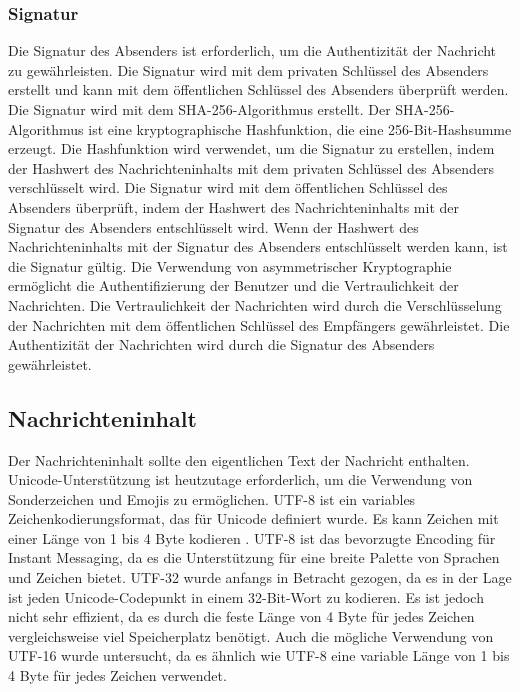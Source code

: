 \subsubsection{Signatur}
\label{subsubsec:signatur}

Die Signatur des Absenders ist erforderlich, um die Authentizität der Nachricht zu gewährleisten. Die Signatur wird mit dem privaten Schlüssel des Absenders erstellt und kann mit dem öffentlichen Schlüssel des Absenders überprüft werden. Die Signatur wird mit dem SHA-256-Algorithmus erstellt. Der SHA-256-Algorithmus ist eine kryptographische Hashfunktion, die eine 256-Bit-Hashsumme erzeugt. Die Hashfunktion wird verwendet, um die Signatur zu erstellen, indem der Hashwert des Nachrichteninhalts mit dem privaten Schlüssel des Absenders verschlüsselt wird. Die Signatur wird mit dem öffentlichen Schlüssel des Absenders überprüft, indem der Hashwert des Nachrichteninhalts mit der Signatur des Absenders entschlüsselt wird. Wenn der Hashwert des Nachrichteninhalts mit der Signatur des Absenders entschlüsselt werden kann, ist die Signatur gültig. Die Verwendung von asymmetrischer Kryptographie ermöglicht die Authentifizierung der Benutzer und die Vertraulichkeit der Nachrichten. Die Vertraulichkeit der Nachrichten wird durch die Verschlüsselung der Nachrichten mit dem öffentlichen Schlüssel des Empfängers gewährleistet. Die Authentizität der Nachrichten wird durch die Signatur des Absenders gewährleistet.

\subsection{Nachrichteninhalt}
\label{subsec:nachrichteninhalt}

Der Nachrichteninhalt sollte den eigentlichen Text der Nachricht enthalten. Unicode-Unterstützung ist heutzutage erforderlich, um die Verwendung von Sonderzeichen und Emojis zu ermöglichen. UTF-8 ist ein variables Zeichenkodierungsformat, das für Unicode definiert wurde. Es kann Zeichen mit einer Länge von 1 bis 4 Byte kodieren \parencite[S. 4]{rfc3629_utf-8}. UTF-8 ist das bevorzugte Encoding für Instant Messaging, da es die Unterstützung für eine breite Palette von Sprachen und Zeichen bietet. UTF-32 wurde anfangs in Betracht gezogen, da es in der Lage ist jeden Unicode-Codepunkt in einem 32-Bit-Wort zu kodieren. Es ist jedoch nicht sehr effizient, da es durch die feste Länge von 4 Byte für jedes Zeichen vergleichsweise viel Speicherplatz benötigt. Auch die mögliche Verwendung von UTF-16 wurde untersucht, da es ähnlich wie UTF-8 eine variable Länge von 1 bis 4 Byte für jedes Zeichen verwendet.

